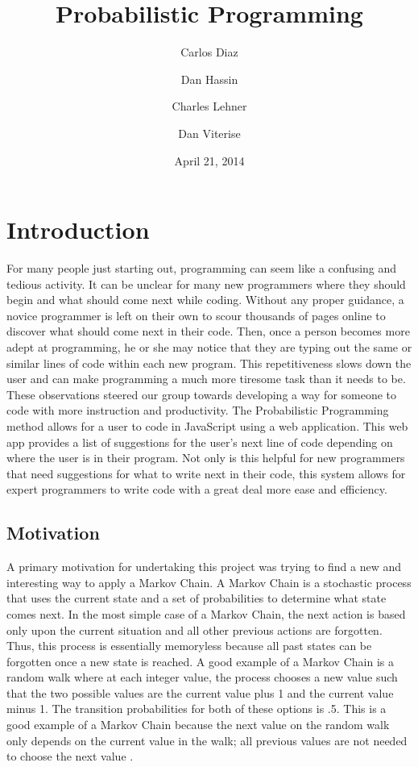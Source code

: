 \documentclass{article}
\title{
Probabilistic Programming
}
\author{
	Carlos Diaz
	\and
	Dan Hassin
	\and
	Charles Lehner
	\and
	Dan Viterise
}
\date{April 21, 2014}
\begin{document}
\maketitle


\section{Introduction}
For many people just starting out, programming can seem like a confusing and tedious activity. It can be unclear for 
many new programmers where they should begin and what should come next while coding. Without any proper guidance, 
a novice programmer is left on their own to scour thousands of pages online to discover what should come next in 
their code. Then, once a person becomes more adept at programming, he or she may notice that they are typing out 
the same or similar lines of code within each new program. This repetitiveness slows down the user and can make 
programming a much more tiresome task than it needs to be. These observations steered our group towards developing
a way for someone to code with more instruction and productivity. The Probabilistic Programming method allows for a user to code in JavaScript
using a web application. This web app provides a list of suggestions for the user's next line of code depending on where
the user is in their program. Not only is this helpful for new programmers that need suggestions for what to write next 
in their code, this system allows for expert programmers to write code with a great deal more ease and efficiency.

\subsection{Motivation}

A primary motivation for undertaking this project was trying to find a new and interesting way to apply a Markov Chain.
A Markov Chain is a stochastic process that uses the current state and a set of probabilities to determine what 
state comes next. In the most simple case of a Markov Chain, the next action is based only upon the current situation
and all other previous actions are forgotten. Thus, this process is essentially memoryless because all past states can
be forgotten once a new state is reached. A good example of a Markov Chain is a random walk where at each integer value,
the process chooses a new value such that the two possible values are the current value plus 1 and the current value
minus 1. The transition probabilities for both of these options is .5. This is a good example of a Markov Chain because
the next value on the random walk only depends on the current value in the walk; all previous values are not needed 
to choose the next value \cite{markov}. 
\end{document}
